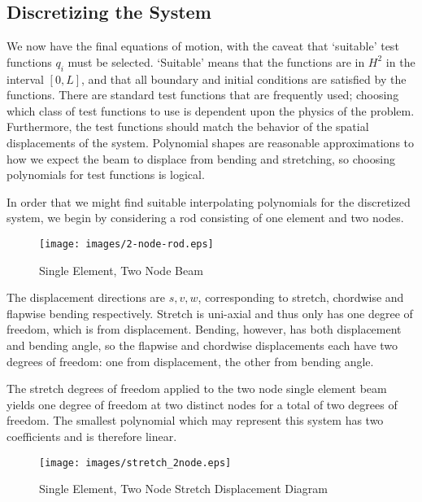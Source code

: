 \subsection{Discretizing the System}
\label{subsec:discretizing}
We now have the final equations of motion, with the caveat that `suitable' test functions $q_i$ must be selected. `Suitable' means that the functions are in $H^2$ in the interval $[0,L]$, and that all boundary and initial conditions are satisfied by the functions. There are standard test functions that are frequently used; choosing which class of test functions to use is dependent upon the physics of the problem. Furthermore, the test functions should match the behavior of the spatial displacements of the system. Polynomial shapes are reasonable approximations to how we expect the beam to displace from bending and stretching, so choosing polynomials for test functions is logical.


In order that we might find suitable interpolating polynomials for the discretized system, we begin by considering a rod consisting of one element and two nodes.

\begin{figure}[ht!]
\caption{Single Element, Two Node Beam}
\centering
\texttt{[image: images/2-node-rod.eps]}
\end{figure}

The displacement directions are $s,v,w$, corresponding to stretch, chordwise and flapwise bending respectively. Stretch is uni-axial and thus only has one degree of freedom, which is from displacement. Bending, however, has both displacement and bending angle, so the flapwise and chordwise displacements each have two degrees of freedom: one from displacement, the other from bending angle.

The stretch degrees of freedom applied to the two node single element beam yields one degree of freedom at two distinct nodes for a total of two degrees of freedom. The smallest polynomial which may represent this system has two coefficients and is therefore linear.

\begin{figure}[ht!]
\caption{Single Element, Two Node Stretch Displacement Diagram}
\centering
\texttt{[image: images/stretch\_2node.eps]}
\label{fig:2-node-stretch-dof}
\end{figure}

